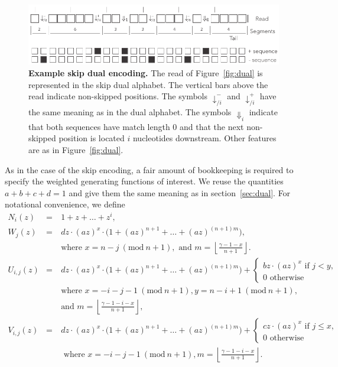 \documentclass{article}
\newcommand{\modulo}[1]{\ (\mathrm{mod}\ #1)}
\begin{document}
\begin{figure}[h]
\centering
\includegraphics[scale=0.85]{sketch_skip_dual.pdf}
\caption{\textbf{Example skip dual encoding.}
The read of Figure~\ref{fig:dual} is represented in the skip dual alphabet.
The vertical bars above the read indicate non-skipped positions. The
symbols $\downarrow_{/i}^-$ and $\downarrow_{/i}^+$ have the same meaning
as in the dual alphabet. The symbols $\Downarrow_i$ indicate that both
sequences have match length 0 and that the next non-skipped position is
located $i$ nucleotides downstream. Other features are as in
Figure~\ref{fig:dual}.}
\label{fig:skip_dual}
\end{figure}

As in the case of the skip encoding, a fair amount of bookkeeping is
required to specify the weighted generating functions of interest.
We reuse the quantities $a+b+c+d=1$ and give them the same meaning as in
section~\ref{sec:dual}. For notational convenience, we define
\begin{eqnarray*}
N_i(z) &=& 1+z+\ldots+z^i, \\
W_j(z) &=& dz \cdot (az)^x \cdot \big( 1 + (az)^{n+1} + \ldots +
  (az)^{(n+1)m} \big), \\
  &\quad& \text{where } x = n-j \modulo{n+1},
  \text{ and } m = \left\lfloor
  \frac{\gamma-1-x}{n+1} \right\rfloor. \\
U_{i,j}(z) &=& dz \cdot (az)^x \cdot
  \big( 1 + (az)^{n+1} + \ldots + (az)^{(n+1)m} \big) +
\begin{cases}
  bz\cdot(az)^x \text{ if } j < y, \\
  0 \text{ otherwise}
\end{cases} \\
  &\quad& \text{where } x = -i-j-1 \modulo{n+1},
  y = n-i+1 \modulo{n+1}, \\
  &\quad& \text{and } m = \left\lfloor \frac{\gamma-1-i-x}{n+1}
    \right\rfloor, \\
V_{i,j}(z) &=& dz \cdot (az)^x \cdot
  \big( 1 + (az)^{n+1} + \ldots + (az)^{(n+1)m} \big) +
\begin{cases}
  cz\cdot(az)^x \text{ if } j \leq x, \\
  0 \text{ otherwise}
\end{cases} \\
  &\quad& \text{ where } x = -i-j-1 \modulo{n+1},
  m = \left\lfloor \frac{\gamma-1-i-x}{n+1} \right\rfloor.
\end{eqnarray*}
\end{document}

